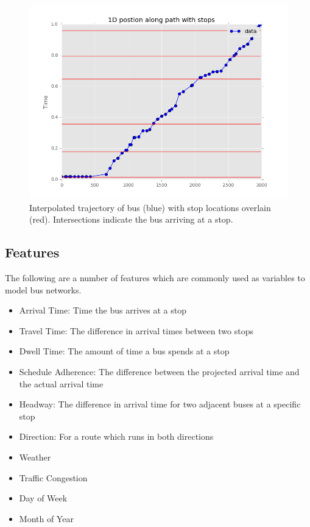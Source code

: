 \begin{figure}
\includegraphics[width=\linewidth]{images/interpolate.png}
\caption{Interpolated trajectory of bus (blue) with stop locations overlain (red). Intersections indicate the bus arriving at a stop.}
\label{interpolate}
\end{figure}

\subsection{Features}

The following are a number of features which are commonly used as variables to model bus networks.

\begin{itemize}
  \item Arrival Time: Time the bus arrives at a stop
  \item Travel Time: The difference in arrival times between two stops
  \item Dwell Time: The amount of time a bus spends at a stop
  \item Schedule Adherence: The difference between the projected arrival time and the actual arrival time
  \item Headway: The difference in arrival time for two adjacent buses at a specific stop
  \item Direction: For a route which runs in both directions
  \item Weather
  \item Traffic Congestion
  \item Day of Week
  \item Month of Year
\end{itemize}

